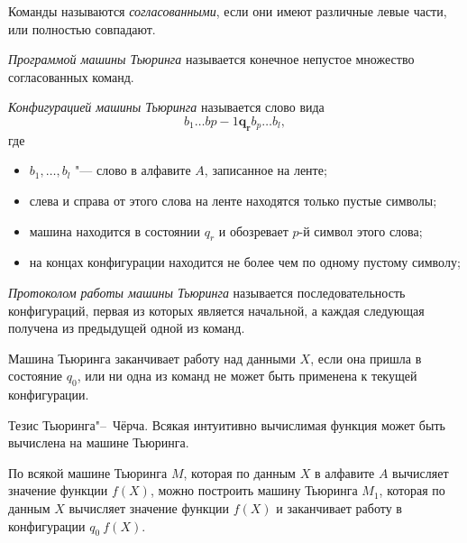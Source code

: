\begin{definition}
	Команды называются \emph{согласованными}, если они имеют различные левые части, или полностью совпадают.
\end{definition}

\begin{definition}
	\emph{Программой машины Тьюринга} называется конечное непустое множество согласованных команд.
\end{definition}

\begin{definition}
	\emph{Конфигурацией машины Тьюринга} называется слово вида
	$$ b_1\dots b{p - 1} \bm{q_r} b_p \dots b_l, $$
	где
	\begin{itemize}
		\item $ b_1, \dots, b_l $ "--- слово в алфавите $ A $, записанное на ленте;
		\item слева и справа от этого слова на ленте находятся только пустые символы;
		\item машина находится в состоянии $ q_r $ и обозревает $ p $-й символ этого слова;
		\item на концах конфигурации находится не более чем по одному пустому символу;
	\end{itemize}
\end{definition}

\begin{definition}
	\emph{Протоколом работы машины Тьюринга} называется последовательность конфигураций, первая из которых является начальной, а каждая следующая получена из предыдущей одной из команд.
\end{definition}

Машина Тьюринга заканчивает работу над данными $ X $, если она пришла в состояние $ q_0 $, или ни одна из команд не может быть применена к текущей конфигурации.

\begin{undefthm}{Тезис Тьюринга"--~Чёрча.}
	Всякая интуитивно вычислимая функция может быть вычислена на машине Тьюринга.
\end{undefthm}

\begin{lemma}
	По всякой машине Тьюринга $ M $, которая по данным $ X $ в алфавите $ A $ вычисляет значение функции $ f(X) $, можно построить машину Тьюринга $ M_1 $, которая по данным $ X $ вычисляет значение функции $ f(X) $ и заканчивает работу в конфигурации $ q_0~f(X) $.
\end{lemma}

